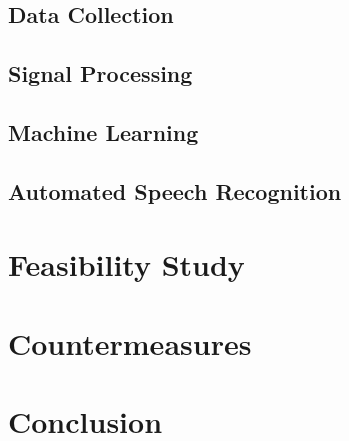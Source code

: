 \documentclass[sigconf, nonacm]{acmart}
\begin{document}
\subsection{Data Collection}
\subsection{Signal Processing}
\subsection{Machine Learning}
\subsection{Automated Speech Recognition}
\section{Feasibility Study}
\section{Countermeasures}
\section{Conclusion}
\end{document}
